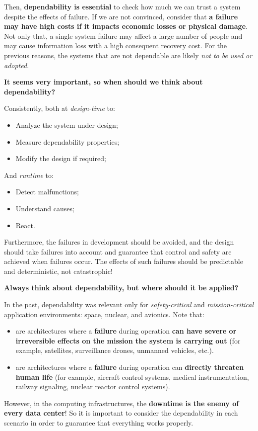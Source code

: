\highspace
Then, \textbf{dependability is essential} to check how much we can trust a system despite the effects of failure. If we are not convinced, consider that \textbf{a failure may have high costs if it impacts economic losses or physical damage}. Not only that, a single system failure may affect a large number of people and may cause information loss with a high consequent recovery cost. For the previous reasons, the systems that are not dependable are likely \emph{not to be used or adopted}.

\begin{flushleft}
    \textcolor{Green3}{ \textbf{It seems very important, so when should we think about dependability?}}
\end{flushleft}
Consistently, both at \emph{design-time} to:
\begin{itemize}
    \item Analyze the system under design;
    \item Measure dependability properties;
    \item Modify the design if required;
\end{itemize}
And \emph{runtime} to:
\begin{itemize}
    \item Detect malfunctions;
    \item Understand causes;
    \item React.
\end{itemize}
Furthermore, the failures in development should be avoided, and the design should take failures into account and guarantee that control and safety are achieved when failures occur. The effects of such failures should be predictable and deterministic, not catastrophic!

\begin{flushleft}
    \textcolor{Green3}{ \textbf{Always think about dependability, but where should it be applied?}}
\end{flushleft}
In the past, dependability was relevant only for \emph{safety-critical} and \emph{mission-critical} application environments: space, nuclear, and avionics. Note that:
\begin{itemize}
    \item {} are architectures where a \textbf{failure} during operation \textbf{can have severe or irreversible effects on the mission the system is carrying out} (for example, satellites, surveillance drones, unmanned vehicles, etc.).
    
    \item {} are architectures where a \textbf{failure} during operation can \textbf{directly threaten human life} (for example, aircraft control systems, medical instrumentation, railway signaling, nuclear reactor control systems).
\end{itemize}
However, in the computing infrastructures, the \textbf{downtime is the enemy of every data center}! So it is important to consider the dependability in each scenario in order to guarantee that everything works properly.

